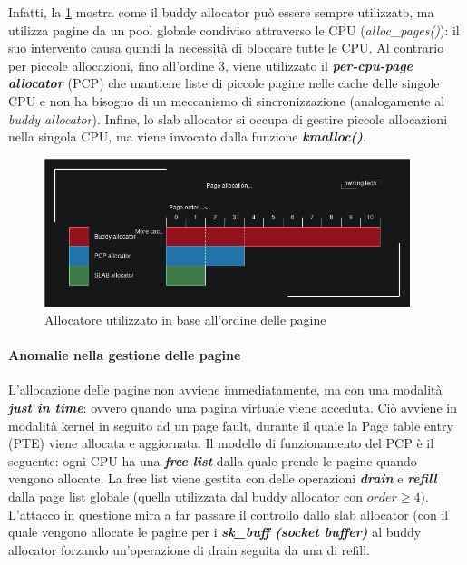 \documentclass{article}
\begin{document}
Infatti, la \cref{fig:allocator-per-order}\cite{NetfilterTablesVulnerability}
mostra come il buddy allocator può essere sempre utilizzato, ma utilizza pagine da un pool globale 
condiviso attraverso le CPU (\textit{alloc\_pages()}): il suo intervento causa quindi la 
necessità di bloccare tutte le CPU. Al contrario per piccole allocazioni, fino all'ordine 
$3$, viene utilizzato il \textbf{\textit{per-cpu-page allocator}} (PCP) che mantiene liste 
di piccole pagine nelle cache delle singole CPU e non ha bisogno di un meccanismo di sincronizzazione 
(analogamente al \textit{buddy allocator}). Infine, lo slab allocator si occupa di 
gestire piccole allocazioni nella singola CPU, ma viene invocato dalla funzione 
\textbf{\textit{kmalloc()}}.

\begin{figure}[h]
  \begin{center}
    \includegraphics[width=0.95\textwidth]{figures/ch1/allocator-per-order.png}
  \end{center}
  \caption{Allocatore utilizzato in base all'ordine delle pagine}\label{fig:allocator-per-order}
\end{figure}

\paragraph{Anomalie nella gestione delle pagine} L'allocazione delle pagine non avviene 
immediatamente, ma con una modalità \textbf{\textit{just in time}}: ovvero quando una pagina 
virtuale viene acceduta. Ciò avviene in modalità kernel in seguito ad un page fault, durante 
il quale la Page table entry (PTE) viene allocata e aggiornata. Il modello di funzionamento del 
PCP è il seguente: ogni CPU ha una \textbf{\textit{free list}} dalla quale prende le pagine 
quando vengono allocate. La free list viene gestita con delle operazioni \textbf{\textit{drain}} e 
\textbf{\textit{refill}} dalla page list globale (quella utilizzata dal buddy allocator con 
$order \geq 4$). L'attacco in questione mira a far passare il controllo dallo slab allocator
(con il quale vengono allocate le pagine per i \textbf{\textit{sk\_buff (socket buffer)}} al 
buddy allocator forzando un'operazione di drain seguita da una di refill.
\end{document}
